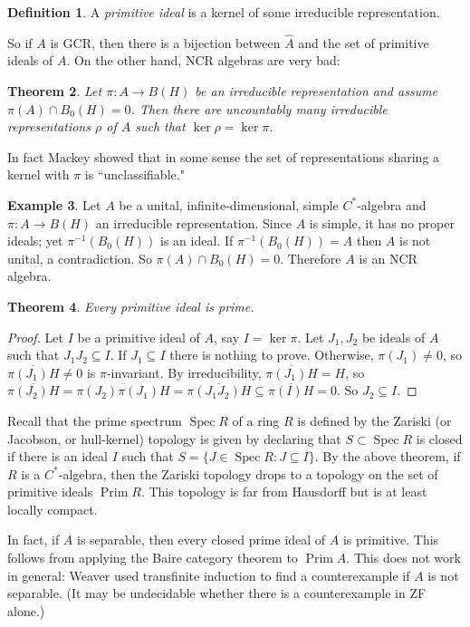 \documentclass[12pt]{report}
\newcommand{\Prim}{\operatorname{Prim}}
\newcommand{\Spec}{\operatorname{Spec}}
\newcommand{\dfn}[1]{\emph{#1}\index{#1}}
\newtheorem{theorem}{Theorem}[chapter]
\theoremstyle{definition}
\newtheorem{definition}[theorem]{Definition}
\newtheorem{example}[theorem]{Example}
\begin{document}
\begin{definition}
    A \dfn{primitive ideal} is a kernel of some irreducible representation.
\end{definition}
    So if $A$ is GCR, then there is a bijection between $\hat A$ and the set of primitive ideals of $A$. On the other hand, NCR algebras are very bad:
\begin{theorem}
    Let $\pi: A \to B(H)$ be an irreducible representation and assume $\pi(A) \cap B_0(H) = 0$. Then there are uncountably many irreducible representations $\rho$ of $A$ such that $\ker \rho = \ker \pi$.
\end{theorem}
    In fact Mackey showed that in some sense the set of representations sharing a kernel with $\pi$ is ``unclassifiable."
\begin{example}
    Let $A$ be a unital, infinite-dimensional, simple $C^*$-algebra and $\pi: A \to B(H)$ an irreducible representation. Since $A$ is simple, it has no proper ideals; yet $\pi^{-1}(B_0(H))$ is an ideal. If $\pi^{-1}(B_0(H)) = A$ then $A$ is not unital, a contradiction. So $\pi(A) \cap B_0(H) = 0$. Therefore $A$ is an NCR algebra.
\end{example}
\begin{theorem}
    Every primitive ideal is prime.
\end{theorem}
\begin{proof}
    Let $I$ be a primitive ideal of $A$, say $I = \ker \pi$. Let $J_1,J_2$ be ideals of $A$ such that $J_1J_2 \subseteq I$. If $J_1 \subseteq I$ there is nothing to prove. Otherwise, $\pi(J_1) \neq 0$, so $\overline{\pi(J_1)H} \neq 0$ is $\pi$-invariant. By irreducibility, $\overline{\pi(J_1)H} = H$, so $\overline{\pi(J_2)H} = \overline{\pi(J_2)\pi(J_1)H} = \overline{\pi(J_1J_2)H} \subseteq \overline{\pi(I)H} = 0$. So $J_2 \subseteq I$.
\end{proof}
    Recall that the prime spectrum $\Spec R$ of a ring $R$ is defined by the Zariski (or Jacobson, or hull-kernel) topology is given by declaring that $S \subset \Spec R$ is closed if there is an ideal $I$ such that $S = \{J \in \Spec R: J \subseteq I\}$. By the above theorem, if $R$ is a $C^*$-algebra, then the Zariski topology drops to a topology on the set of primitive ideals $\Prim R$. This topology is far from Hausdorff but is at least locally compact.

    In fact, if $A$ is separable, then every closed prime ideal of $A$ is primitive. This follows from applying the Baire category theorem to $\Prim A$. This does not work in general: Weaver used transfinite induction to find a counterexample if $A$ is not separable. (It may be undecidable whether there is a counterexample in ZF alone.)
\end{document}
